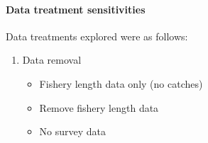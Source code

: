 \documentclass[11pt,
  english,
  a4paper,
]{article}
\begin{document}
\hypertarget{data-treatment-sensitivities}{%
\paragraph{Data treatment sensitivities}\label{data-treatment-sensitivities}}

\leavevmode\tagmcend\tagstructend


Data treatments explored were as follows:

\leavevmode\tagmcend\tagstructend\par


\begin{enumerate}
\def\labelenumi{\arabic{enumi}.}
\item

  Data removal

  \tagmcend\tagstructend\tagstructend


  \begin{itemize}
  \item


    Fishery length data only (no catches)

    \tagmcend\tagstructend\tagstructend

    \tagmcend\tagstructend\tagstructend
  \item


    Remove fishery length data

    \tagmcend\tagstructend\tagstructend

    \tagmcend\tagstructend\tagstructend
  \item


    No survey data

    \tagmcend\tagstructend\tagstructend


\end{itemize}
\end{enumerate}
\end{document}
